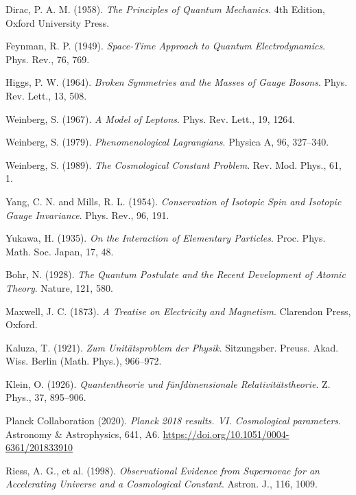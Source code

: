 \documentclass[12pt,a4paper]{article}
\theoremstyle{definition}
\begin{document}
\begin{thebibliography}{99}
		Dirac, P. A. M. (1958). 
		\textit{The Principles of Quantum Mechanics}. 
		4th Edition, Oxford University Press.
		
		Feynman, R. P. (1949). 
		\textit{Space-Time Approach to Quantum Electrodynamics}. 
		Phys. Rev., 76, 769.
		
		Higgs, P. W. (1964).
		\textit{Broken Symmetries and the Masses of Gauge Bosons}.
		Phys. Rev. Lett., 13, 508.
		
		Weinberg, S. (1967).
		\textit{A Model of Leptons}.
		Phys. Rev. Lett., 19, 1264.
		
		Weinberg, S. (1979). 
		\textit{Phenomenological Lagrangians}. 
		Physica A, 96, 327--340.
		
		Weinberg, S. (1989). 
		\textit{The Cosmological Constant Problem}. 
		Rev. Mod. Phys., 61, 1.
		
		Yang, C. N. and Mills, R. L. (1954).
		\textit{Conservation of Isotopic Spin and Isotopic Gauge Invariance}.
		Phys. Rev., 96, 191.
		
		Yukawa, H. (1935).
		\textit{On the Interaction of Elementary Particles}.
		Proc. Phys. Math. Soc. Japan, 17, 48.
		
		Bohr, N. (1928).
		\textit{The Quantum Postulate and the Recent Development of Atomic Theory}.
		Nature, 121, 580.
		
		Maxwell, J. C. (1873). 
		\textit{A Treatise on Electricity and Magnetism}. 
		Clarendon Press, Oxford.
		
		Kaluza, T. (1921).
		\textit{Zum Unitätsproblem der Physik}.
		Sitzungsber. Preuss. Akad. Wiss. Berlin (Math. Phys.), 966--972.
		
		Klein, O. (1926).
		\textit{Quantentheorie und fünfdimensionale Relativitätstheorie}.
		Z. Phys., 37, 895--906.
		
		Planck Collaboration (2020). 
		\textit{Planck 2018 results. VI. Cosmological parameters}. 
		Astronomy \& Astrophysics, 641, A6. 
		\url{https://doi.org/10.1051/0004-6361/201833910}
		
		Riess, A. G., et al. (1998). 
		\textit{Observational Evidence from Supernovae for an Accelerating Universe and a Cosmological Constant}. 
		Astron. J., 116, 1009.
		

\end{thebibliography}
\end{document}
